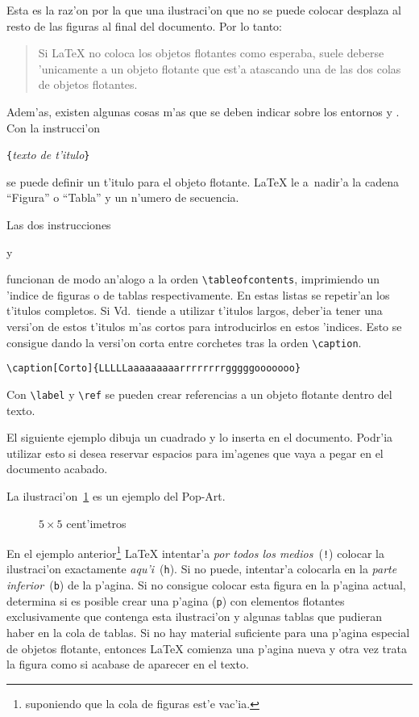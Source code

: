 Esta es la raz'on por la que una ilustraci'on que no se puede colocar
desplaza al resto de las figuras al final del documento. Por lo tanto:


\begin{quote}
  Si \LaTeX{} no coloca los objetos flotantes como esperaba, suele
  deberse 'unicamente a un objeto flotante que est'a atascando una de
  las dos colas de objetos flotantes.
\end{quote}

\bigskip
\noindent Adem'as, existen algunas cosas m'as que se deben indicar
sobre los entornos  y . Con la instrucci'on
\begin{command}
\verb|{|\emph{texto de t'itulo}\verb|}|
\end{command}
\noindent se puede definir un t'itulo para el objeto flotante. \LaTeX{}
le a~nadir'a la cadena ``Figura'' o ``Tabla'' y un n'umero de secuencia.


Las dos instrucciones
\begin{command}
 y 
\end{command}
\noindent funcionan de modo an'alogo a la orden
\verb|\tableofcontents|, imprimiendo un 'indice de figuras o de tablas
respectivamente. En estas listas se repetir'an los t'itulos
completos. Si Vd.\ tiende a utilizar t'itulos largos, deber'ia tener
una versi'on de estos t'itulos m'as cortos para introducirlos en estos
'indices. Esto se consigue dando la versi'on corta entre corchetes
tras la orden \verb|\caption|.
\begin{code}
\verb|\caption[Corto]{LLLLLaaaaaaaaarrrrrrrrgggggooooooo}|
\end{code}

Con \verb|\label| y \verb|\ref| se pueden crear referencias a un
objeto flotante dentro del texto.

El siguiente ejemplo dibuja un cuadrado y lo inserta en el
documento. Podr'ia utilizar esto si desea reservar espacios para
im'agenes que vaya a pegar en el documento acabado.

\begin{example}
La ilustraci'on~\ref{blanco} es un ejemplo del Pop-Art.
\begin{figure}[!hbp]
\makebox[\textwidth]{\framebox[5cm]{\rule{0pt}{5cm}}}
\caption{$5\times 5$ cent'imetros} \label{blanco}
\end{figure}
\end{example}

\noindent En el ejemplo anterior\footnote{suponiendo que la cola de
  figuras est'e vac'ia.} \LaTeX{} intentar'a \emph{por todos los
  medios}~(\texttt{!}) colocar la ilustraci'on exactamente
\emph{aqu'i}~(\texttt{h}). Si no puede, intentar'a colocarla en la
\emph{parte inferior}~(\texttt{b}) de la p'agina. Si no consigue
colocar esta figura en la p'agina actual, determina si es posible
crear una p'agina (\verb|p|) con elementos flotantes exclusivamente
que contenga esta ilustraci'on y algunas tablas que pudieran haber en
la cola de tablas. Si no hay material suficiente para una p'agina
especial de objetos flotante, entonces \LaTeX{} comienza una p'agina
nueva y otra vez trata la figura como si acabase de aparecer en el
texto.


